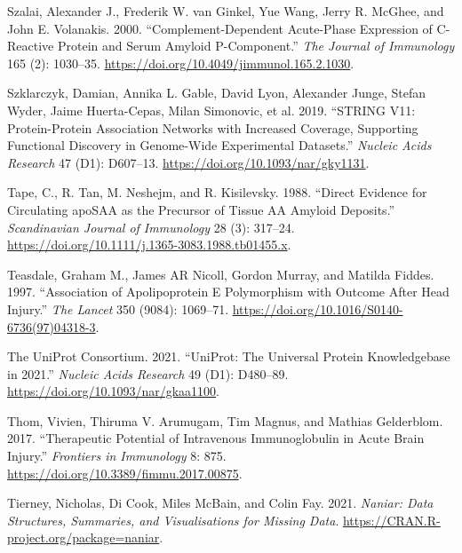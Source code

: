 \documentclass[9pt,lineno]{elife}
\newlength{\cslhangindent}
\newlength{\cslentryspacingunit} %
\newenvironment{CSLReferences}[2] %
 {%
  \setlength{\parindent}{0pt}
  \ifodd #1
  \let\oldpar\par
  \def\par{\hangindent=\cslhangindent\oldpar}
  \fi
  \setlength{\parskip}{#2\cslentryspacingunit}
 }%
 {}
\begin{document}
\begin{CSLReferences}{1}{0}
\leavevmode{}%
Szalai, Alexander J., Frederik W. van Ginkel, Yue Wang, Jerry R. McGhee, and John E. Volanakis. 2000. {``Complement-{Dependent Acute-Phase Expression} of {C-Reactive Protein} and {Serum Amyloid P-Component}.''} \emph{The Journal of Immunology} 165 (2): 1030--35. \url{https://doi.org/10.4049/jimmunol.165.2.1030}.

\leavevmode{}%
Szklarczyk, Damian, Annika L. Gable, David Lyon, Alexander Junge, Stefan Wyder, Jaime Huerta-Cepas, Milan Simonovic, et al. 2019. {``{STRING} V11: Protein-Protein Association Networks with Increased Coverage, Supporting Functional Discovery in Genome-Wide Experimental Datasets.''} \emph{Nucleic Acids Research} 47 (D1): D607--13. \url{https://doi.org/10.1093/nar/gky1131}.

\leavevmode{}%
Tape, C., R. Tan, M. Neshejm, and R. Kisilevsky. 1988. {``Direct {Evidence} for {Circulating apoSAA} as the {Precursor} of {Tissue AA Amyloid Deposits}.''} \emph{Scandinavian Journal of Immunology} 28 (3): 317--24. \url{https://doi.org/10.1111/j.1365-3083.1988.tb01455.x}.

\leavevmode{}%
Teasdale, Graham M., James AR Nicoll, Gordon Murray, and Matilda Fiddes. 1997. {``Association of Apolipoprotein {E} Polymorphism with Outcome After Head Injury.''} \emph{The Lancet} 350 (9084): 1069--71. \url{https://doi.org/10.1016/S0140-6736(97)04318-3}.

\leavevmode{}%
The UniProt Consortium. 2021. {``{UniProt}: The Universal Protein Knowledgebase in 2021.''} \emph{Nucleic Acids Research} 49 (D1): D480--89. \url{https://doi.org/10.1093/nar/gkaa1100}.

\leavevmode{}%
Thom, Vivien, Thiruma V. Arumugam, Tim Magnus, and Mathias Gelderblom. 2017. {``Therapeutic {Potential} of {Intravenous Immunoglobulin} in {Acute Brain Injury}.''} \emph{Frontiers in Immunology} 8: 875. \url{https://doi.org/10.3389/fimmu.2017.00875}.

\leavevmode{}%
Tierney, Nicholas, Di Cook, Miles McBain, and Colin Fay. 2021. \emph{Naniar: Data Structures, Summaries, and Visualisations for Missing Data}. \url{https://CRAN.R-project.org/package=naniar}.


\end{CSLReferences}
\end{document}
